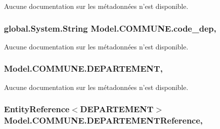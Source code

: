 Aucune documentation sur les métadonnées n'est disponible. 

\hypertarget{class_model_1_1_c_o_m_m_u_n_e_a0c96be96f831dddcb05051cf3513986b}{
\subsubsection[{code\-\_\-dep}]{\setlength{\rightskip}{0pt plus 5cm}global.\-System.\-String Model.\-C\-O\-M\-M\-U\-N\-E.\-code\-\_\-dep\hspace{0.3cm}{\ttfamily [get]}, {\ttfamily [set]}}}\label{class_model_1_1_c_o_m_m_u_n_e_a0c96be96f831dddcb05051cf3513986b}


Aucune documentation sur les métadonnées n'est disponible. 

\hypertarget{class_model_1_1_c_o_m_m_u_n_e_a0b2beac6a64f8fa9413209ff4dae52f6}{
\subsubsection[{D\-E\-P\-A\-R\-T\-E\-M\-E\-N\-T}]{ Model.\-C\-O\-M\-M\-U\-N\-E.\-D\-E\-P\-A\-R\-T\-E\-M\-E\-N\-T\hspace{0.3cm}{\ttfamily [get]}, {\ttfamily [set]}}}\label{class_model_1_1_c_o_m_m_u_n_e_a0b2beac6a64f8fa9413209ff4dae52f6}


Aucune documentation sur les métadonnées n'est disponible. 

\hypertarget{class_model_1_1_c_o_m_m_u_n_e_a6561fcb5ec3bd228f22d5169b60ee1ba}{
\subsubsection[{D\-E\-P\-A\-R\-T\-E\-M\-E\-N\-T\-Reference}]{\setlength{\rightskip}{0pt plus 5cm}Entity\-Reference$<${\bf D\-E\-P\-A\-R\-T\-E\-M\-E\-N\-T}$>$ Model.\-C\-O\-M\-M\-U\-N\-E.\-D\-E\-P\-A\-R\-T\-E\-M\-E\-N\-T\-Reference\hspace{0.3cm}{\ttfamily [get]}, {\ttfamily [set]}}}\label{class_model_1_1_c_o_m_m_u_n_e_a6561fcb5ec3bd228f22d5169b60ee1ba}


